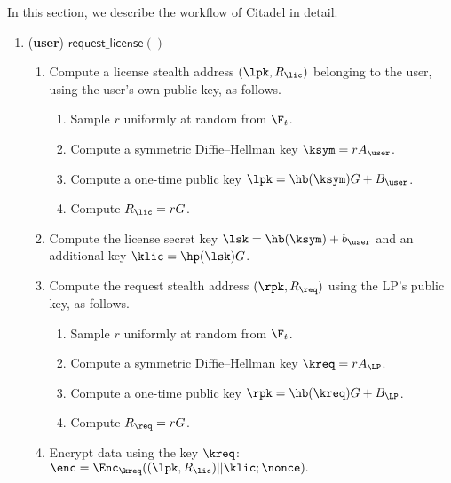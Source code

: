 

In this section, we describe the workflow of Citadel in detail.

\begin{enumerate}

\item (\textbf{user}) $\mathsf{request\_license}()$

	\begin{enumerate}
	
		\item Compute a license stealth address $(\lpk, R_{\lic})$ belonging to the user, using the user's own public key, as follows.
			
			\begin{enumerate}
				\item Sample $r$ uniformly at random from $\F_t$.
				\item Compute a symmetric Diffie--Hellman key $\ksym = rA_{\user}$.
				\item Compute a one-time public key $\lpk = \hb(\ksym)G + B_{\user}$.
				\item Compute $R_{\lic} = rG$.
			\end{enumerate}
		
		\item Compute the license secret key $\lsk = \hb(\ksym) + b_{\user}$ and an additional key $\klic = \hp(\lsk)G$. 
		
		\item Compute the request stealth address $(\rpk, R_{\req})$ using the LP's public key, as follows.
			
			\begin{enumerate}
				\item Sample $r$ uniformly at random from $\F_t$.
				\item Compute a symmetric Diffie--Hellman key $\kreq = rA_{\LP}$.
				\item Compute a one-time public key $\rpk = \hb(\kreq)G + B_{\LP}$.
				\item Compute $R_{\req} = rG$.
			\end{enumerate}
		
		\item Encrypt data using the key $\kreq$: $\enc = \Enc_{\kreq} ((\lpk, R_{\lic})||\klic; \nonce).$
		
		

\end{enumerate}
\end{enumerate}
